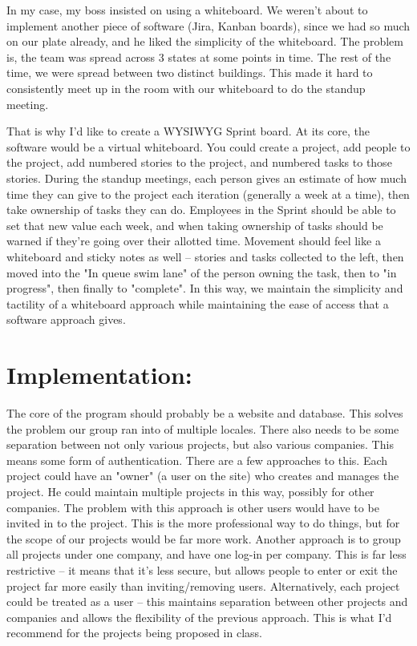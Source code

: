 \documentclass[12pt]{article}
\begin{document}
          In my case, my boss insisted on using a whiteboard. We weren't about to implement another piece of software (Jira, Kanban boards), since we had so much on our plate already, and he liked the simplicity of the whiteboard. The problem is, the team was spread across 3 states at some points in time. The rest of the time, we were spread between two distinct buildings. This made it hard to consistently meet up in the room with our whiteboard to do the standup meeting.
          
          That is why I'd like to create a WYSIWYG Sprint board. At its core, the software would be a virtual whiteboard. You could create a project, add people to the project, add numbered stories to the project, and numbered tasks to those stories. During the standup meetings, each person gives an estimate of how much time they can give to the project each iteration (generally a week at a time), then take ownership of tasks they can do. Employees in the Sprint should be able to set that new value each week, and when taking ownership of tasks should be warned if they're going over their allotted time. Movement should feel like a whiteboard and sticky notes as well – stories and tasks collected to the left, then moved into the "In queue swim lane" of the person owning the task, then to "in progress", then finally to "complete". In this way, we maintain the simplicity and tactility of a whiteboard approach while maintaining the ease of access that a software approach gives.


 
\section{Implementation:}

          The core of the program should probably be a website and database. This solves the problem our group ran into of multiple locales. There also needs to be some separation between not only various projects, but also various companies. This means some form of authentication. There are a few approaches to this. Each project could have an "owner" (a user on the site) who creates and manages the project. He could maintain multiple projects in this way, possibly for other companies. The problem with this approach is other users would have to be invited in to the project. This is the more professional way to do things, but for the scope of our projects would be far more work. Another approach is to group all projects under one company, and have one log-in per company. This is far less restrictive – it means that it's less secure, but allows people to enter or exit the project far more easily than inviting/removing users. Alternatively, each project could be treated as a user – this maintains separation between other projects and companies and allows the flexibility of the previous approach. This is what I'd recommend for the projects being proposed in class. 
          
\end{document}
